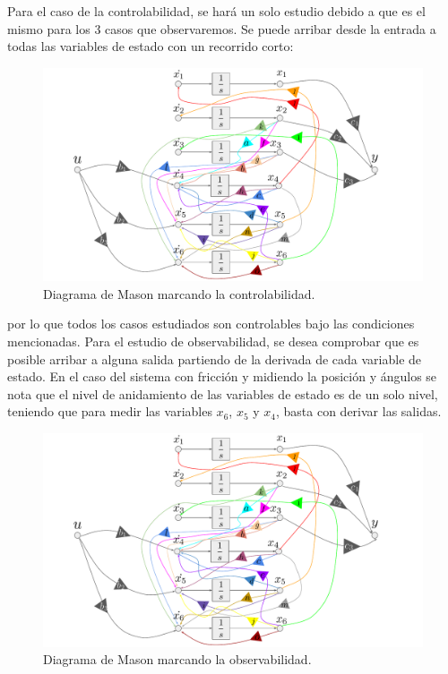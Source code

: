 Para el caso de la controlabilidad, se hará un solo estudio debido a que es el mismo para los 3 casos que observaremos. Se puede arribar desde la entrada a todas las variables de estado con un recorrido corto:
\begin{figure}[H]
	\centering
	\includegraphics[width=1\linewidth,page = 2]{../Modelo Teorico/ImagenesModelo Teorico/Mason.pdf}
	\caption{Diagrama de Mason marcando la controlabilidad.}	
	\label{fig:masonsisfyxofmC}
\end{figure}
por lo que todos los casos estudiados son controlables bajo las condiciones mencionadas.
Para el estudio de observabilidad, se desea comprobar que es posible arribar a alguna salida partiendo de la derivada de cada variable de estado. En el caso del sistema con fricción y midiendo la posición y ángulos se nota que el nivel de anidamiento de las variables de estado es de un solo nivel, teniendo que para medir las variables $x_6$, $x_5$ y $x_4$, basta con derivar las salidas. 
\begin{figure}[H]
	\centering
	\includegraphics[width=1\linewidth,page = 3]{../Modelo Teorico/ImagenesModelo Teorico/Mason.pdf}
	\caption{Diagrama de Mason marcando la observabilidad.}	
	\label{fig:masonsisfyxofmO}
\end{figure}
